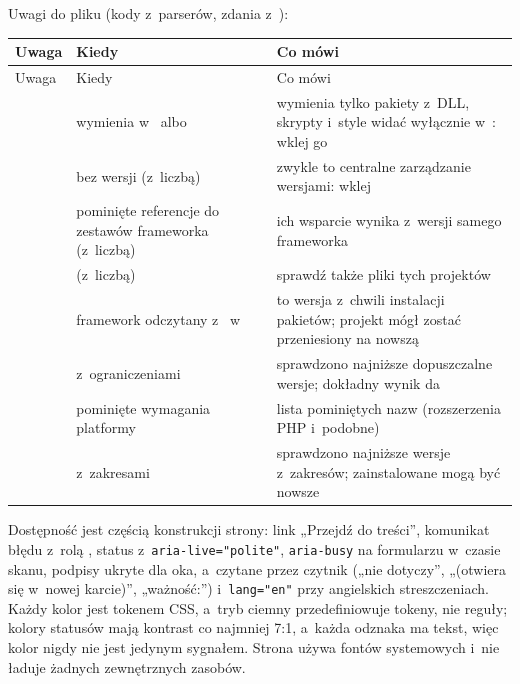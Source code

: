 Uwagi do pliku (kody z~parserów, zdania z~):

\begin{xltabular}{\linewidth}{@{}>{\raggedright\arraybackslash}p{4.6cm} >{\raggedright\arraybackslash}p{4.0cm} >{\raggedright\arraybackslash}X@{}}
\toprule
Uwaga & Kiedy & Co mówi \\
\midrule
\endfirsthead
\toprule
Uwaga & Kiedy & Co mówi \\
\midrule
\endhead
{} &  wymienia  w~ albo  &  wymienia tylko pakiety z~DLL, skrypty i~style widać wyłącznie w~: wklej go \\
 &  bez wersji (z~liczbą) & zwykle to centralne zarządzanie wersjami: wklej  \\
 & pominięte referencje do zestawów frameworka (z~liczbą) & ich wsparcie wynika z~wersji samego frameworka \\
 &  (z~liczbą) & sprawdź także pliki  tych projektów \\
 & framework odczytany z~ w~ & to wersja z~chwili instalacji pakietów; projekt mógł zostać przeniesiony na nowszą \\
 &  z~ograniczeniami & sprawdzono najniższe dopuszczalne wersje; dokładny wynik da  \\
 & pominięte wymagania platformy & lista pominiętych nazw (rozszerzenia PHP i~podobne) \\
 &  z~zakresami & sprawdzono najniższe wersje z~zakresów; zainstalowane mogą być nowsze \\
\bottomrule
\end{xltabular}

Dostępność jest częścią konstrukcji strony: link „Przejdź do treści”, komunikat błędu
z~rolą , status z~\texttt{aria-live="polite"}, \texttt{aria-busy} na
formularzu w~czasie skanu, podpisy ukryte dla oka, a~czytane przez czytnik („nie dotyczy”,
„(otwiera się w~nowej karcie)”, „ważność:”) i~\texttt{lang="en"} przy angielskich
streszczeniach. Każdy kolor jest tokenem CSS, a~tryb ciemny przedefiniowuje tokeny, nie
reguły; kolory statusów mają kontrast co najmniej 7:1, a~każda odznaka ma tekst, więc kolor
nigdy nie jest jedynym sygnałem. Strona używa fontów systemowych i~nie ładuje żadnych
zewnętrznych zasobów.

